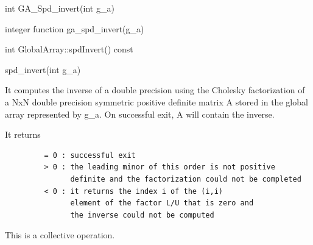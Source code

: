 \documentclass[12pt]{article}
\begin{document}

\begin{capi}
\begin{ccode}
int GA_Spd_invert(int g_a)
\end{ccode}
\begin{funcargs}
\end{funcargs}
\end{capi}

\begin{fapi}
\begin{fcode}
integer function ga_spd_invert(g_a)
\end{fcode}
\begin{funcargs}
\end{funcargs}
\end{fapi}

\begin{cxxapi}
\begin{cxxcode}
int GlobalArray::spdInvert() const
\end{cxxcode}
\begin{funcargs}
\end{funcargs}
\end{cxxapi}

\begin{pyapi}
\begin{pycode}
spd_invert(int g_a) 
\end{pycode}
\end{pyapi} 



\begin{desc}


It computes the inverse of a double precision using the Cholesky 
factorization of a NxN double precision symmetric positive definite 
matrix A stored in the global array represented by g_a. On successful 
exit, A will contain the inverse.

It returns
\begin{verbatim}
         = 0 : successful exit
         > 0 : the leading minor of this order is not positive
               definite and the factorization could not be completed
         < 0 : it returns the index i of the (i,i)
               element of the factor L/U that is zero and
               the inverse could not be computed
\end{verbatim}

This is a collective operation.
\end{desc}
\end{document}
